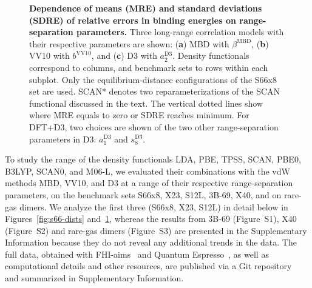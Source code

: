 \begin{figure}[t!]
{
}
\caption{\textbf{Dependence of means (MRE) and standard deviations (SDRE) of relative errors in binding energies on range-separation parameters.}
Three long-range correlation models with their respective parameters are shown: (\textbf a) MBD with $\beta^\text{MBD}$, (\textbf b) VV10 with $b^\text{VV10}$, and (\textbf c) D3 with $a_2^\text{D3}$.
Density functionals correspond to columns, and benchmark sets to rows within each subplot.
Only the equilibrium-distance configurations of the S66x8 set are used.
SCAN* denotes two reparameterizations of the SCAN functional discussed in the text. %
The vertical dotted lines show where MRE equals to zero or SDRE reaches minimum.
For DFT+D3, two choices are shown of the two other range-separation parameters in D3: $a_1^\text{D3}$ and $s_8^\text{D3}$.
}\label{fig:param-fitting}
\end{figure}

To study the range of the density functionals LDA, PBE, TPSS, SCAN, PBE0, B3LYP, SCAN0, and M06-L, we evaluated their combinations with the vdW methods MBD, VV10, and D3 at a range of their respective range-separation parameters, on the benchmark sets S66x8, X23, S12L, 3B-69, X40, and on rare-gas dimers.
We analyze the first three (S66x8, X23, S12L) in detail below in Figures~\ref{fig:s66-dists} and~\ref{fig:param-fitting}, whereas the results from 3B-69 (Figure~S1), X40 (Figure~S2) and rare-gas dimers (Figure~S3) are presented in the Supplementary Information because they do not reveal any additional trends in the data.
The full data, obtained with FHI-aims~\cite{BlumCPC09} and Quantum Espresso~\cite{GiannozziJPCM09,HamannPRB13}, as well as computational details and other resources, are published via a Git repository~\cite{GitRepo} and summarized in Supplementary Information.

